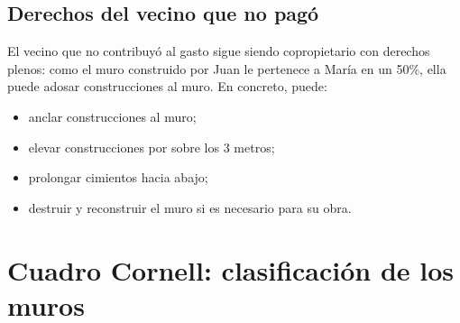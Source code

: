 \documentclass[12pt,oneside]{book}
\begin{document}
\subsection{Derechos del vecino que no pagó}

El vecino que no contribuyó al gasto sigue siendo copropietario con derechos plenos: como el muro construido por Juan le pertenece a María en un 50\%, ella puede adosar construcciones al muro. En concreto, puede:

\begin{itemize}
\item anclar construcciones al muro;
\item elevar construcciones por sobre los 3 metros;
\item prolongar cimientos hacia abajo;
\item destruir y reconstruir el muro si es necesario para su obra.
\end{itemize}

\section{Cuadro Cornell: clasificación de los muros}
\end{document}
